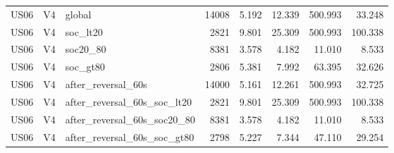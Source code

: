 \begin{tabular}{lllrrrrr}
US06 & V4 & global & 14008 & 5.192 & 12.339 & 500.993 & 33.248 \\
US06 & V4 & soc\_lt20 & 2821 & 9.801 & 25.309 & 500.993 & 100.338 \\
US06 & V4 & soc20\_80 & 8381 & 3.578 & 4.182 & 11.010 & 8.533 \\
US06 & V4 & soc\_gt80 & 2806 & 5.381 & 7.992 & 63.395 & 32.626 \\
US06 & V4 & after\_reversal\_60s & 14000 & 5.161 & 12.261 & 500.993 & 32.725 \\
US06 & V4 & after\_reversal\_60s\_soc\_lt20 & 2821 & 9.801 & 25.309 & 500.993 & 100.338 \\
US06 & V4 & after\_reversal\_60s\_soc20\_80 & 8381 & 3.578 & 4.182 & 11.010 & 8.533 \\
US06 & V4 & after\_reversal\_60s\_soc\_gt80 & 2798 & 5.227 & 7.344 & 47.110 & 29.254 \\
\hline
\end{tabular}
